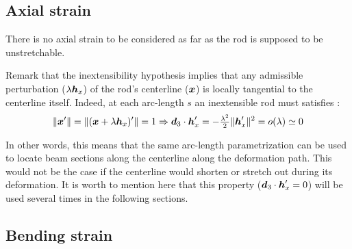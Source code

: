 \subsection{Axial strain}
There is no axial strain to be considered as far as the rod is supposed to be unstretchable.

Remark that the inextensibility hypothesis implies that any admissible perturbation ($\lambda\boldsymbol{h}_x$) of the rod's centerline ($\boldsymbol{x}$) is locally tangential to the centerline itself. Indeed, at each arc-length $s$ an inextensible rod must satisfies :
\begin{equation}\label{eq:3_6}
	\|\boldsymbol{x}'\| = \|(\boldsymbol{x}+\lambda\boldsymbol{h}_x)'\| = 1 \Rightarrow \boldsymbol{d}_3 \cdot \boldsymbol{h}'_x = -\tfrac{\lambda^2}{2}\|\boldsymbol{h}'_x\|^2 = o(\lambda) \simeq 0
\end{equation}

In other words, this means that the same arc-length parametrization can be used to locate beam sections along the centerline along the deformation path. This would not be the case if the centerline would shorten or stretch out during its deformation. It is worth to mention here that this property ($\boldsymbol{d}_3 \cdot \boldsymbol{h}'_x = 0$) will be used several times in the following sections.

\subsection{Bending strain}

